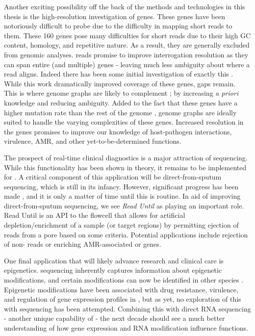 
Another exciting possibility off the back of the methods and technologies in this thesis is the high-resolution investigation of \ppe{} genes. These genes have been notoriously difficult to probe due to the difficulty in mapping short reads to them. These 160 genes pose many difficulties for short reads due to their high GC content, homology, and repetitive nature. As a result, they are generally excluded from genomic analyses. \ont{} reads promise to improve interrogation resolution as they can span entire (and multiple) \ppe{} genes - leaving much less ambiguity about where a read aligns. Indeed there has been some initial investigation of exactly this \cite{bainomugisa2018}. While this work dramatically improved coverage of these genes, gaps remain. This is where genome graphs are likely to complement \ont{}; by increasing \textit{a priori} knowledge and reducing ambiguity. Added to the fact that these genes have a higher mutation rate than the rest of the genome \cite{bainomugisa2018}, genome graphs are ideally suited to handle the varying complexities of these genes. Increased resolution in the \ppe{} genes promises to improve our knowledge of \mtb{} host-pathogen interactions, virulence, AMR, and other yet-to-be-determined functions.

The prospect of real-time clinical diagnostics is a major attraction of \ont{} sequencing. While this functionality has been shown in theory, it remains to be implemented for \mtb{}. A critical component of this application will be direct-from-sputum \ont{} sequencing, which is still in its infancy. However, significant progress has been made \cite{George2020,Votintseva2017}, and it is only a matter of time until this is routine. In aid of improving direct-from-sputum sequencing, we see \emph{Read Until} \cite{Payne2021,Kovaka2021} as playing an important role. Read Until is an API to the flowcell that allows for artificial depletion/enrichment of a sample (or target regions) by permitting ejection of reads from a pore based on some criteria. Potential applications include rejection of non-\mtb{} reads or enriching AMR-associated or \ppe{} genes.

One final application that will likely advance \mtb{} research and clinical care is epigenetics. \ont{} sequencing inherently captures information about epigenetic modifications, and certain modifications can now be identified in other species \cite{Furlan2021}. Epigenetic modifications have been associated with drug resistance, virulence, and regulation of gene expression profiles in \mtb{} \cite{Phelan2018Methylation,Shell2013,Zhu2016Precision}, but as yet, no exploration of this with \ont{} sequencing has been attempted. Combining this with direct RNA sequencing - another unique capability of \ont{} - the next decade should see a much better understanding of how gene expression and RNA modification influence \mtb{} functions.
